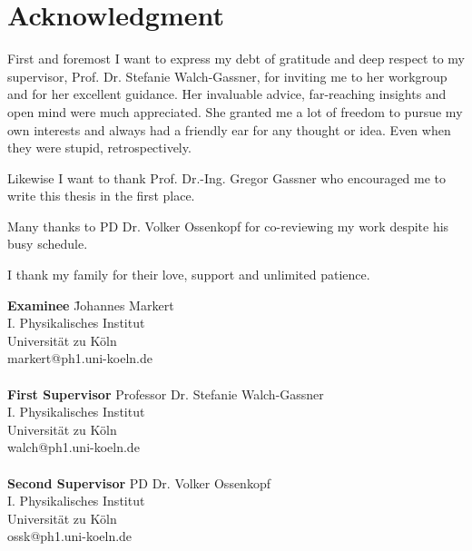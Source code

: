 \section*{Acknowledgment}

First and foremost I want to express my debt of gratitude and deep respect to
my supervisor, Prof. Dr. Stefanie Walch-Gassner, for inviting me to her
workgroup and for her excellent guidance.  Her invaluable advice, far-reaching
insights and open mind were much appreciated.  She granted me a lot of freedom
to pursue my own interests and always had a friendly ear for any thought or
idea. Even when they were stupid, retrospectively.

Likewise I want to thank Prof. Dr.-Ing. Gregor Gassner who encouraged me to
write this thesis in the first place.

Many thanks to PD Dr. Volker Ossenkopf for co-reviewing my work despite his
busy schedule.

\vspace{0.5cm}

I thank my family for their love, support and unlimited patience.

\vspace{3cm}


\begin{tabbing}
\hspace{1cm}    \= \textbf{Examinee} \hspace{4cm}  \= Johannes Markert \\
                \>                                 \> I. Physikalisches Institut \\
                \>                                 \> Universität zu Köln \\
                \>                                 \> markert@ph1.uni-koeln.de  \\\\

                \> \textbf{First Supervisor}       \> Professor Dr. Stefanie Walch-Gassner \\
                \>                                 \> I. Physikalisches Institut \\
                \>                                 \> Universität zu Köln \\
                \>                                 \> walch@ph1.uni-koeln.de  \\\\

                \> \textbf{Second Supervisor}      \> PD Dr. Volker Ossenkopf \\
                \>                                 \> I. Physikalisches Institut \\
                \>                                 \> Universität zu Köln \\
                \>                                 \> ossk@ph1.uni-koeln.de
\end{tabbing}
